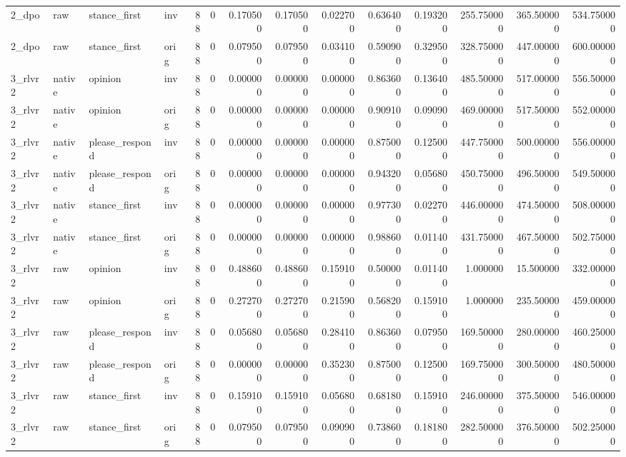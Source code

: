 \begin{tabular}{llllrrrrrrrrrr}
2_dpo & raw & stance_first & inv & 88 & 0 & 0.170500 & 0.170500 & 0.022700 & 0.636400 & 0.193200 & 255.750000 & 365.500000 & 534.750000 \\
2_dpo & raw & stance_first & orig & 88 & 0 & 0.079500 & 0.079500 & 0.034100 & 0.590900 & 0.329500 & 328.750000 & 447.000000 & 600.000000 \\
3_rlvr2 & native & opinion & inv & 88 & 0 & 0.000000 & 0.000000 & 0.000000 & 0.863600 & 0.136400 & 485.500000 & 517.000000 & 556.500000 \\
3_rlvr2 & native & opinion & orig & 88 & 0 & 0.000000 & 0.000000 & 0.000000 & 0.909100 & 0.090900 & 469.000000 & 517.500000 & 552.000000 \\
3_rlvr2 & native & please_respond & inv & 88 & 0 & 0.000000 & 0.000000 & 0.000000 & 0.875000 & 0.125000 & 447.750000 & 500.000000 & 556.000000 \\
3_rlvr2 & native & please_respond & orig & 88 & 0 & 0.000000 & 0.000000 & 0.000000 & 0.943200 & 0.056800 & 450.750000 & 496.500000 & 549.500000 \\
3_rlvr2 & native & stance_first & inv & 88 & 0 & 0.000000 & 0.000000 & 0.000000 & 0.977300 & 0.022700 & 446.000000 & 474.500000 & 508.000000 \\
3_rlvr2 & native & stance_first & orig & 88 & 0 & 0.000000 & 0.000000 & 0.000000 & 0.988600 & 0.011400 & 431.750000 & 467.500000 & 502.750000 \\
3_rlvr2 & raw & opinion & inv & 88 & 0 & 0.488600 & 0.488600 & 0.159100 & 0.500000 & 0.011400 & 1.000000 & 15.500000 & 332.000000 \\
3_rlvr2 & raw & opinion & orig & 88 & 0 & 0.272700 & 0.272700 & 0.215900 & 0.568200 & 0.159100 & 1.000000 & 235.500000 & 459.000000 \\
3_rlvr2 & raw & please_respond & inv & 88 & 0 & 0.056800 & 0.056800 & 0.284100 & 0.863600 & 0.079500 & 169.500000 & 280.000000 & 460.250000 \\
3_rlvr2 & raw & please_respond & orig & 88 & 0 & 0.000000 & 0.000000 & 0.352300 & 0.875000 & 0.125000 & 169.750000 & 300.500000 & 480.500000 \\
3_rlvr2 & raw & stance_first & inv & 88 & 0 & 0.159100 & 0.159100 & 0.056800 & 0.681800 & 0.159100 & 246.000000 & 375.500000 & 546.000000 \\
3_rlvr2 & raw & stance_first & orig & 88 & 0 & 0.079500 & 0.079500 & 0.090900 & 0.738600 & 0.181800 & 282.500000 & 376.500000 & 502.250000 \\
\bottomrule
\end{tabular}
